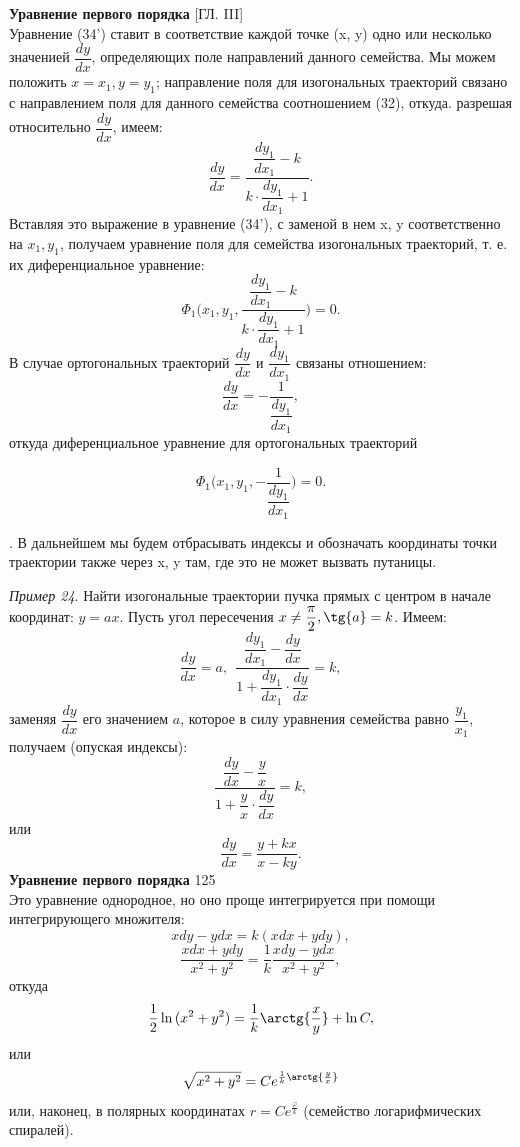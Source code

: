 \documentclass[a4paper,12pt]{article}
\begin{document}
\setcounter{equation}{34}
 \hfill \textbf{Уравнение первого порядка} \hfill [ГЛ. III] \\

Уравнение (34') ставит в соответствие каждой точке (x, y) одно или несколько значенией $\dfrac{dy}{dx}$, определяющих поле направлений данного семейства. Мы можем положить $x = x_1, y = y_1$; направление поля для изогональных траекторий связано с направлением поля для данного семейства соотношением (32), откуда. разрешая относительно $\dfrac{dy}{dx}$, имеем: 
$$
	\frac{dy}{dx} = \dfrac{ \dfrac{dy_1}{dx_1}-k }{ k\cdot\dfrac{dy_1}{dx_1}+1 }.
$$
Вставляя это выражение в уравнение (34'), с заменой в нем x, y соответственно на $x_1, y_1$, получаем уравнение поля для семейства изогональных траекторий, т. е. их диференциальное уравнение: 
\begin{equation}
	\Phi_1\Bigg(x_1, y_1, \dfrac{ \dfrac{dy_1}{dx_1}-k }{ k\cdot\dfrac{dy_1}{dx_1}+1 }\Bigg)=0.
\end{equation}
В случае ортогональных траекторий $\dfrac{dy}{dx}$ и $\dfrac{dy_1}{dx_1}$ связаны отношением: 
$$
	\frac{dy}{dx} = -\dfrac{ 1 }{ \dfrac{dy_1}{dx_1}},
$$
откуда диференциальное уравнение для ортогональных траекторий

\begin{equation} 
	\Phi_1\Bigg(x_1, y_1, -\dfrac{ 1 }{ \dfrac{dy_1}{dx_1} }\Bigg)=0.\tag{35'}
\end{equation}

. В дальнейшем мы будем отбрасывать индексы и обозначать координаты точки траектории также через x, y там, где это не может вызвать путаницы.

\textit{Пример 24}. Найти изогональные траектории пучка прямых с центром в начале координат: $y=ax$. Пусть угол пересечения $x \neq \dfrac{\pi}{2}, \tg{a}=k$. Имеем:
$$
	\dfrac{dy}{dx}=a, \ \ \dfrac{\dfrac{dy_1}{dx_1}-\dfrac{dy}{dx}}{1+\dfrac{dy_1}{dx_1}\cdot\dfrac{dy}{dx}}=k,
$$
заменяя $\dfrac{dy}{dx}$ его значением $a$, которое в силу уравнения семейства равно $\dfrac{y_1}{x_1}$, получаем (опуская индексы):
$$
	\dfrac{\dfrac{dy}{dx}-\dfrac{y}{x}}{1+\dfrac{y}{x}\cdot\dfrac{dy}{dx}}=k,
$$
или
$$
	\dfrac{dy}{dx}=\dfrac{y+kx}{x-ky}.
$$
\newpage
 \hfill \textbf{Уравнение первого порядка} \hfill 125 \\

Это уравнение однородное, но оно проще интегрируется при помощи интегрирующего множителя:
$$
xdy-ydx=k(xdx+ydy),
$$
$$
	\frac{xdx+ydy}{x^2+y^2}=\frac{1}{k}\frac{xdy-ydx}{x^2+y^2},
$$
откуда
$$
	\frac{1}{2}\ln{(x^2+y^2)}=\frac{1}{k}\arctg{\dfrac{x}{y}}+\ln{C},
$$
или
$$
	\sqrt{x^2+y^2}=Ce^{\frac{1}{k}\arctg{\frac{y}{x}}}
$$
или, наконец, в полярных координатах $r=Ce^\frac{\varphi}{k}$ (семейство логарифмических спиралей).
\end{document}

